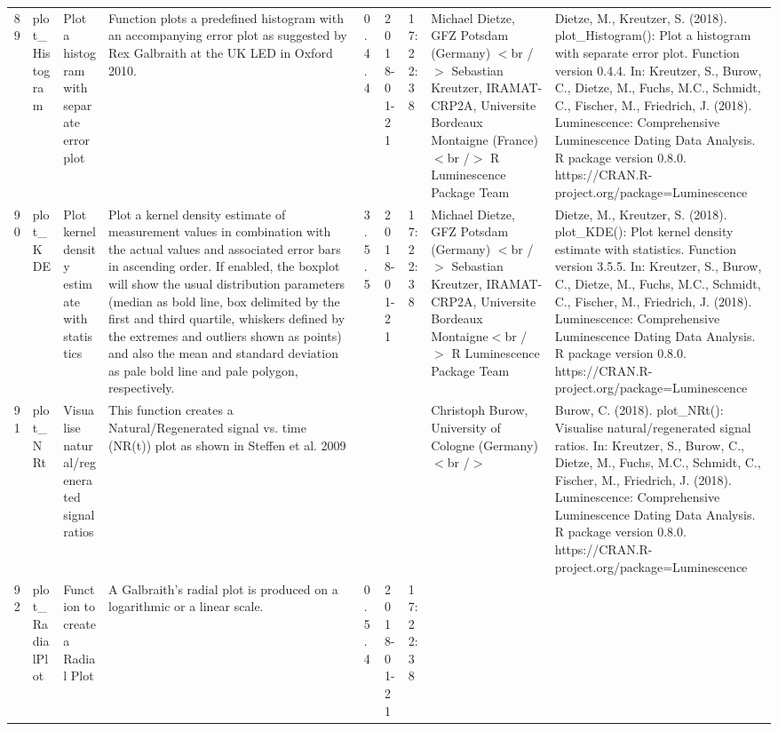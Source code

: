 \begin{table}[ht]
\begin{tabular}{rllllllll}
 \\ 
  89 & plot\_Histogram & Plot a histogram with separate error plot & Function plots a predefined histogram with an accompanying error plot as suggested by Rex Galbraith at the UK LED in Oxford 2010. & 0.4.4 & 2018-01-21 & 17:22:38
 & Michael Dietze, GFZ Potsdam (Germany) $<$br /$>$ Sebastian Kreutzer, IRAMAT-CRP2A, Universite Bordeaux Montaigne (France)$<$br /$>$  R Luminescence Package Team & Dietze, M., Kreutzer, S. (2018). plot\_Histogram(): Plot a histogram with separate error plot. Function version 0.4.4. In: Kreutzer, S., Burow, C., Dietze, M., Fuchs, M.C., Schmidt, C., Fischer, M., Friedrich, J. (2018). Luminescence: Comprehensive Luminescence Dating Data Analysis. R package version 0.8.0. https://CRAN.R-project.org/package=Luminescence
 \\ 
  90 & plot\_KDE & Plot kernel density estimate with statistics & Plot a kernel density estimate of measurement values in combination with the actual values and associated error bars in ascending order. If enabled, the boxplot will show the usual distribution parameters (median as bold line, box delimited by the first and third quartile, whiskers defined by the extremes and outliers shown as points) and also the mean and standard deviation as pale bold line and pale polygon, respectively. & 3.5.5 & 2018-01-21 & 17:22:38
 & Michael Dietze, GFZ Potsdam (Germany) $<$br /$>$ Sebastian Kreutzer, IRAMAT-CRP2A, Universite Bordeaux Montaigne$<$br /$>$  R Luminescence Package Team & Dietze, M., Kreutzer, S. (2018). plot\_KDE(): Plot kernel density estimate with statistics. Function version 3.5.5. In: Kreutzer, S., Burow, C., Dietze, M., Fuchs, M.C., Schmidt, C., Fischer, M., Friedrich, J. (2018). Luminescence: Comprehensive Luminescence Dating Data Analysis. R package version 0.8.0. https://CRAN.R-project.org/package=Luminescence
 \\ 
  91 & plot\_NRt & Visualise natural/regenerated signal ratios & This function creates a Natural/Regenerated signal vs. time (NR(t)) plot as shown in Steffen et al. 2009 &  &  &  & Christoph Burow, University of Cologne (Germany)$<$br /$>$ & Burow, C. (2018). plot\_NRt(): Visualise natural/regenerated signal ratios. In: Kreutzer, S., Burow, C., Dietze, M., Fuchs, M.C., Schmidt, C., Fischer, M., Friedrich, J. (2018). Luminescence: Comprehensive Luminescence Dating Data Analysis. R package version 0.8.0. https://CRAN.R-project.org/package=Luminescence
 \\ 
  92 & plot\_RadialPlot & Function to create a Radial Plot & A Galbraith's radial plot is produced on a logarithmic or a linear scale. & 0.5.4 & 2018-01-21 & 17:22:38

\end{tabular}
\end{table}
